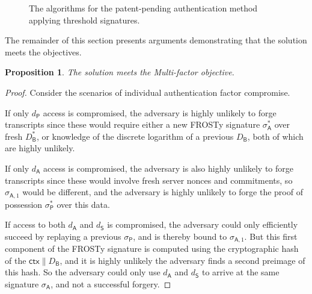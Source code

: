 \documentclass[a4paper]{article}
\newtheorem*{proposition}{Proposition}
\begin{document}
\begin{figure}[t]
\begin{pcvstack}[boxed,center,space=1em]
	\begin{pchstack}[center,space=1em]
	\end{pchstack}
\end{pcvstack}
\caption{The algorithms for the patent-pending authentication method applying threshold signatures.}
\label{fig:algos}
\end{figure}

The remainder of this section presents arguments demonstrating that the solution meets the objectives.

\begin{proposition}
The solution meets the Multi-factor objective.
\end{proposition}

\begin{proof}
Consider the scenarios of individual authentication factor compromise.

If only $d_\mathsf P$ access is compromised, the adversary is highly unlikely to forge transcripts since these would require either a new FROSTy signature $\sigma_\mathsf A^*$ over fresh $D_\mathsf B^*$, or knowledge of the discrete logarithm of a previous $D_\mathsf B$, both of which are highly unlikely.

If only $d_\mathsf A$ access is compromised, the adversary is also highly unlikely to forge transcripts since these would involve fresh server nonces and commitments, so $\sigma_{\mathsf A,1}$ would be different, and the adversary is highly unlikely to forge the proof of possession $\sigma_\mathsf P^*$ over this data.

If access to both $d_\mathsf A$ and $d_\mathsf S$ is compromised, the adversary could only efficiently succeed by replaying a previous $\sigma_\mathsf P$, and is thereby bound to $\sigma_{\mathsf A,1}$. But this first component of the FROSTy signature is computed using the cryptographic hash of the $\mathsf{ctx}\|D_\mathsf B$, and it is highly unlikely the adversary finds a second preimage of this hash. So the adversary could only use $d_\mathsf A$ and $d_\mathsf S$ to arrive at the same signature $\sigma_\mathsf A$, and not a successful forgery.
\end{proof}
\end{document}
